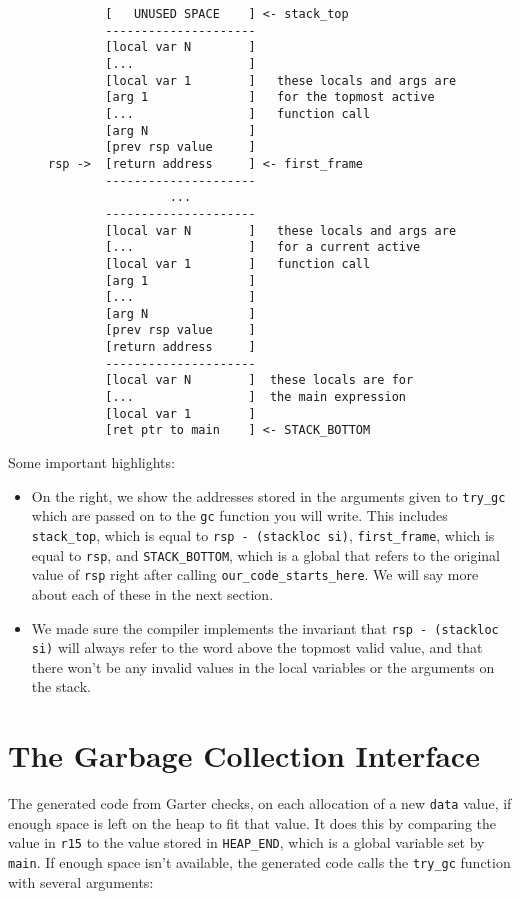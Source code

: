 \documentclass[10pt, oneside]{article}
\begin{document}
\begin{figure}
\begin{verbatim}
        [   UNUSED SPACE    ] <- stack_top
        ---------------------
        [local var N        ]
        [...                ]
        [local var 1        ]   these locals and args are
        [arg 1              ]   for the topmost active
        [...                ]   function call
        [arg N              ]
        [prev rsp value     ]
rsp ->  [return address     ] <- first_frame
        ---------------------
                 ...            
        ---------------------
        [local var N        ]   these locals and args are
        [...                ]   for a current active
        [local var 1        ]   function call
        [arg 1              ]
        [...                ]
        [arg N              ]
        [prev rsp value     ]
        [return address     ]
        ---------------------
        [local var N        ]  these locals are for
        [...                ]  the main expression
        [local var 1        ]
        [ret ptr to main    ] <- STACK_BOTTOM
\end{verbatim}
\end{figure}

Some important highlights:

\begin{itemize}
\item On the right, we show the addresses stored in the arguments given to
{\tt try\_gc} which are passed on to the {\tt gc} function you will write.
This includes {\tt stack\_top}, which is equal to {\tt rsp - (stackloc si)},
{\tt first\_frame}, which is equal to {\tt rsp}, and {\tt STACK\_BOTTOM},
which is a global that refers to the original value of {\tt rsp} right after
calling {\tt our\_code\_starts\_here}. We will say more about each of these
in the next section.
\item We made sure the compiler implements the invariant that {\tt rsp -
(stackloc si)} will always refer to the word above the topmost valid value,
and that there won't be any invalid values in the local variables or the
arguments on the stack.
\end{itemize}

\section*{The Garbage Collection Interface}

The generated code from Garter checks, on each allocation of a new {\tt data}
value, if enough space is left on the heap to fit that value. It does this by
comparing the value in {\tt r15} to the value stored in {\tt HEAP\_END},
which is a global variable set by {\tt main}. If enough space isn't
available, the generated code calls the {\tt try\_gc} function with several arguments:
\end{document}
